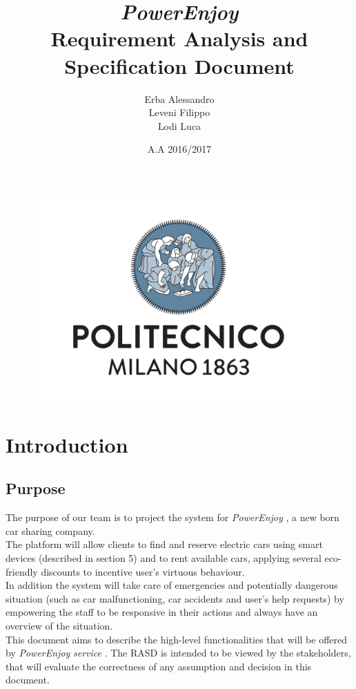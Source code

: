 \documentclass[english]{article}
\newcommand{\powerenjoy}{\textit{PowerEnjoy }}
\newcommand{\service}{\textit{service }}
\begin{document}
\begin{figure}
	\centering
	\includegraphics[scale=0.5]{logo.pdf} 
\end{figure}


\title{\powerenjoy\\
 Requirement Analysis and Specification Document\\
}

\date{A.A 2016/2017}

\author{Erba Alessandro\\
 Leveni Filippo\\
 Lodi Luca}

\maketitle
\pagebreak{}

\tableofcontents{} \pagebreak{}

\section{Introduction}
	\subsection{Purpose}

		The purpose of our team is to project the system for \powerenjoy, a new born car sharing company. \\
 		The platform will allow clients to find and reserve electric cars using smart devices (described in section 5) and to rent available cars, applying several eco-friendly discounts to incentive user's virtuous behaviour.\\
 		In addition the system will take care of emergencies and potentially dangerous situation (such as car malfunctioning, car accidents and user's help requests) by empowering the staff to be responsive in their actions and always have an overview of the situation.\\
 		 \tab \tab This document aims to describe the high-level functionalities that will be offered by \powerenjoy \service. The RASD is intended to be viewed by the stakeholders, that will evaluate the correctness of any assumption and decision in this document.
\end{document}
